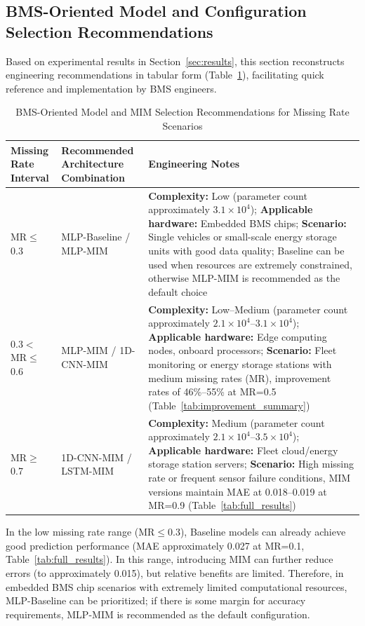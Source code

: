 \documentclass[5p,times]{elsarticle}
\begin{document}
\subsection{BMS-Oriented Model and Configuration Selection Recommendations}

Based on experimental results in Section~\ref{sec:results}, this section reconstructs engineering recommendations in tabular form (Table~\ref{tab:bms_selection}), facilitating quick reference and implementation by BMS engineers.

\begin{table}[t]
\centering
\small
\caption{BMS-Oriented Model and MIM Selection Recommendations for Missing Rate Scenarios}
\label{tab:bms_selection}
\begin{tabular}{@{}p{2.5cm}p{4cm}p{6cm}@{}}
\toprule
\textbf{Missing Rate Interval} & \textbf{Recommended Architecture Combination} & \textbf{Engineering Notes} \\
\midrule
MR$\leq$0.3 & MLP-Baseline / MLP-MIM & \textbf{Complexity:} Low (parameter count approximately $3.1\times10^4$); \textbf{Applicable hardware:} Embedded BMS chips; \textbf{Scenario:} Single vehicles or small-scale energy storage units with good data quality; Baseline can be used when resources are extremely constrained, otherwise MLP-MIM is recommended as the default choice \\
\midrule
0.3$<$MR$\leq$0.6 & MLP-MIM / 1D-CNN-MIM & \textbf{Complexity:} Low--Medium (parameter count approximately $2.1\times10^4$--$3.1\times10^4$); \textbf{Applicable hardware:} Edge computing nodes, onboard processors; \textbf{Scenario:} Fleet monitoring or energy storage stations with medium missing rates (MR), improvement rates of 46\%--55\% at MR=0.5 (Table~\ref{tab:improvement_summary}) \\
\midrule
MR$\geq$0.7 & 1D-CNN-MIM / LSTM-MIM & \textbf{Complexity:} Medium (parameter count approximately $2.1\times10^4$--$3.5\times10^4$); \textbf{Applicable hardware:} Fleet cloud/energy storage station servers; \textbf{Scenario:} High missing rate or frequent sensor failure conditions, MIM versions maintain MAE at 0.018--0.019 at MR=0.9 (Table~\ref{tab:full_results}) \\
\bottomrule
\end{tabular}
\end{table}

In the low missing rate range (MR$\leq$0.3), Baseline models can already achieve good prediction performance (MAE approximately 0.027 at MR=0.1, Table~\ref{tab:full_results}). In this range, introducing MIM can further reduce errors (to approximately 0.015), but relative benefits are limited. Therefore, in embedded BMS chip scenarios with extremely limited computational resources, MLP-Baseline can be prioritized; if there is some margin for accuracy requirements, MLP-MIM is recommended as the default configuration.
\end{document}
